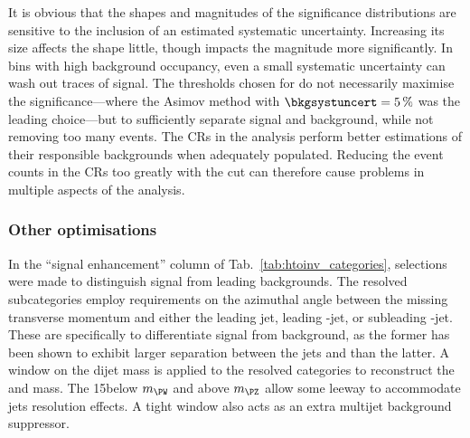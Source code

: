 It is obvious that the shapes and magnitudes of the significance distributions are sensitive to the inclusion of an estimated systematic uncertainty. Increasing its size affects the shape little, though impacts the magnitude more significantly. In bins with high background occupancy, even a small systematic uncertainty can wash out traces of signal. The thresholds chosen for \omegaTilde do not necessarily maximise the significance---where the Asimov method with $\bkgsystuncert = \text{5\,\%}$ was the leading choice---but to sufficiently separate signal and background, while not removing too many events. The \glspl{CR} in the analysis perform better estimations of their responsible backgrounds when adequately populated. Reducing the event counts in the \glspl{CR} too greatly with the \omegaTilde cut can therefore cause problems in multiple aspects of the analysis.




\subsubsection{Other optimisations}
\label{subsubsec:htoinv_other_optimisations}

In the ``signal enhancement'' column of Tab.~\ref{tab:htoinv_categories}, selections were made to distinguish signal from leading backgrounds. The \ttH resolved subcategories employ requirements on the azimuthal angle between the missing transverse momentum and either the leading jet, leading \Pbottom-jet, or subleading \Pbottom-jet. These are specifically to differentiate \ttH signal from \ttbar background, as the former has been shown to exhibit larger separation between the \glspl{jet} and \ptmiss than the latter. A window on the dijet mass is applied to the \VH resolved categories to reconstruct the \PW and \PZ mass. The 15\GeV below $m_{\PW}$ and above $m_{\PZ}$ allow some leeway to accommodate \glspl{jet} resolution effects. A tight window also acts as an extra multijet background suppressor.
